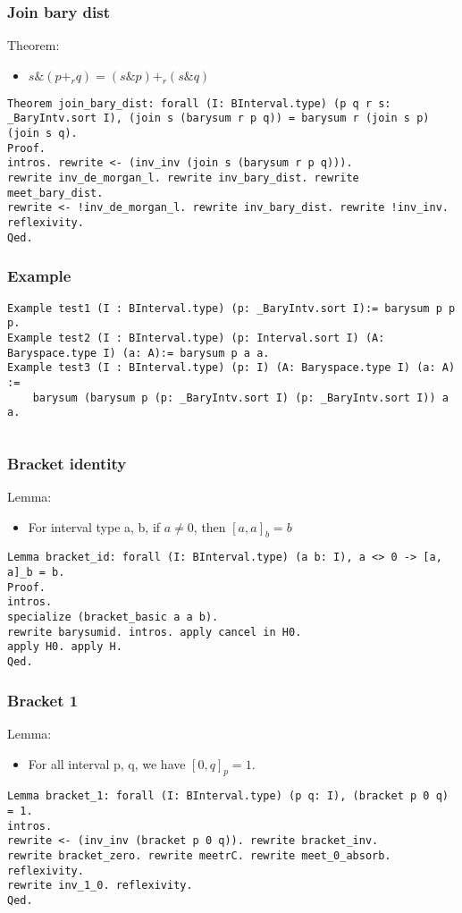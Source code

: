 \documentclass[a4paper,10pt]{article} %
\begin{document}
\subsubsection{Join bary dist}
Theorem:
\begin{itemize}
    \item $s \& (p +_rq) = (s \& p) + _r(s \& q)$
\end{itemize}
\begin{lstlisting}
Theorem join_bary_dist: forall (I: BInterval.type) (p q r s: _BaryIntv.sort I), (join s (barysum r p q)) = barysum r (join s p) (join s q).
Proof.
intros. rewrite <- (inv_inv (join s (barysum r p q))). 
rewrite inv_de_morgan_l. rewrite inv_bary_dist. rewrite meet_bary_dist.
rewrite <- !inv_de_morgan_l. rewrite inv_bary_dist. rewrite !inv_inv.
reflexivity.
Qed.
\end{lstlisting}

\subsubsection{Example}
\begin{lstlisting}
Example test1 (I : BInterval.type) (p: _BaryIntv.sort I):= barysum p p p.
Example test2 (I : BInterval.type) (p: Interval.sort I) (A: Baryspace.type I) (a: A):= barysum p a a. 
Example test3 (I : BInterval.type) (p: I) (A: Baryspace.type I) (a: A) := 
    barysum (barysum p (p: _BaryIntv.sort I) (p: _BaryIntv.sort I)) a a.
\end{lstlisting}
\begin{verbatim}

\end{verbatim}

\subsubsection{Bracket identity}
Lemma:
\begin{itemize}
    \item For interval type a, b, if $a \neq 0$, then $[a, a]_b = b$
\end{itemize}
\begin{lstlisting}
Lemma bracket_id: forall (I: BInterval.type) (a b: I), a <> 0 -> [a, a]_b = b.
Proof.
intros. 
specialize (bracket_basic a a b). 
rewrite barysumid. intros. apply cancel in H0. 
apply H0. apply H.
Qed.
\end{lstlisting}

\subsubsection{Bracket 1}
Lemma:
\begin{itemize}
    \item For all interval p, q, we have $[0, q]_p = 1$.
\end{itemize}
\begin{lstlisting}
Lemma bracket_1: forall (I: BInterval.type) (p q: I), (bracket p 0 q) = 1.
intros.
rewrite <- (inv_inv (bracket p 0 q)). rewrite bracket_inv. 
rewrite bracket_zero. rewrite meetrC. rewrite meet_0_absorb.
reflexivity.
rewrite inv_1_0. reflexivity.
Qed.
\end{lstlisting}
\end{document}

